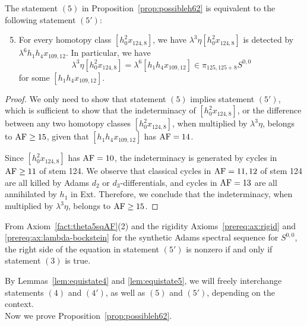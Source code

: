 \begin{lemma} \label{lem:equistate5}
    The statement $(5)$ in Proposition~\ref{prop:possibleh62} is equivalent to the following statement $(5')$:
    \begin{enumerate}\setcounter{enumi}{4}
    \item For every homotopy class $[h_0^2x_{124,8}]$, we have
    $\lambda^3 \eta [h_0^2x_{124,8}]$ is detected by $\lambda^6 h_1h_4x_{109,12}$. In particular, we have 
    $$\lambda^3 \eta [h_0^2x_{124,8}] = \lambda^6 [h_1h_4x_{109,12}] \in \pi_{125,125+8} S^{0,0}$$
    for some $[h_1h_4x_{109,12}]$.
    \end{enumerate}
\end{lemma}

\begin{proof}
    We only need to show that statement $(5)$ implies statement $(5')$, which is sufficient to show that the indeterminacy of $[h_0^2x_{124,8}]$, or the difference between any two homotopy classes $[h_0^2x_{124,8}]$, when multiplied by $\lambda^3 \eta$, belongs to $\mathrm{AF} \ge 15$, given that $[h_1h_4x_{109,12}]$ has $\mathrm{AF}=14$.

    Since $[h_0^2x_{124,8}]$ has $\mathrm{AF}=10$, the indeterminacy is generated by cycles in $\mathrm{AF} \ge 11$ of stem 124. We observe that classical cycles in $\mathrm{AF}=11, 12$ of stem 124 are all killed by Adams $d_2$ or $d_3$-differentials, and cycles in $\mathrm{AF}=13$ are all annihilated by $h_1$ in Ext. Therefore, we conclude that the indeterminacy, when multiplied by $\lambda^3 \eta$, belongs to $\mathrm{AF} \ge 15$.
\end{proof}

\begin{remark}
    From Axiom~\ref{fact:theta5sqAF}(2) and the rigidity Axioms~\ref{prereq:ax:rigid} and \ref{prereq:ax:lambda-bockstein} for the synthetic Adams spectral sequence for $S^{0,0}$, the right side of the equation in statement $(5')$ is nonzero if and only if statement $(3)$ is true.
\end{remark}


By Lemmas~\ref{lem:equistate4} and \ref{lem:equistate5}, we will freely interchange statements $(4)$ and $(4')$, as well as $(5)$ and $(5')$, depending on the context.\\

Now we prove Proposition~\ref{prop:possibleh62}.


